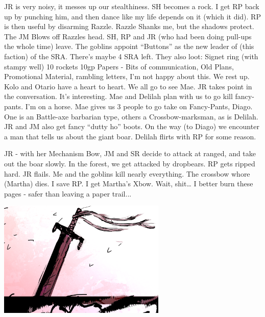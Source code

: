 JR is very noisy, it messes up our stealthiness.\medskip
SH becomes a rock.\medskip
I get RP back up by punching him, and then dance like my life depends on it (which it did).\medskip
RP is then useful by disarming Razzle.\medskip
Razzle Shanks me, but the shadows protect.\medskip
The JM Blows off Razzles head.\medskip
SH, RP and JR (who had been doing pull-ups the whole time) leave.\medskip
The goblins appoint “Buttons” as the new leader of (this faction) of the SRA.\medskip
There's maybe 4 SRA left.\medskip
They also loot: Signet ring (with stampy well) 10 rockets 10gp\medskip
Papers - Bits of communication, Old Plans, Promotional Material, rambling letters,\medskip
I’m not happy about this.\medskip
We rest up.\medskip
Kolo and Otario have a heart to heart.\medskip
We all go to see Mae. JR takes point in the conversation. It’s interesting. Mae and Delilah plan with us to go kill fancy-pants.\medskip
I’m on a horse.\medskip
Mae gives us 3 people to go take on Fancy-Pants, Diago. One is an Battle-axe barbarian type, others a Crossbow-marksman, as is Delilah.\medskip
JR and JM also get fancy “dutty ho” boots.\medskip
On the way (to Diago) we encounter a man that tells us about the giant boar. Delilah flirts with RP for some reason.\medskip

JR - with her Mechanism Bow, JM and SR decide to attack at ranged, and take out the boar slowly.
In the forest, we get attacked by dropbears.\medskip
RP gets ripped hard. JR flails.\medskip
Me and the goblins kill nearly everything.\medskip
The crossbow whore (Martha) dies.\medskip
I save RP.\medskip
I get Martha’s Xbow.\medskip
Wait, shit… I better burn these pages - safer than leaving a paper trail...
\begin{center}
\includegraphics[width=80mm]{./content/img/otoriagrave.png}
\begin{figure}[h]
\end{figure}
\end{center}